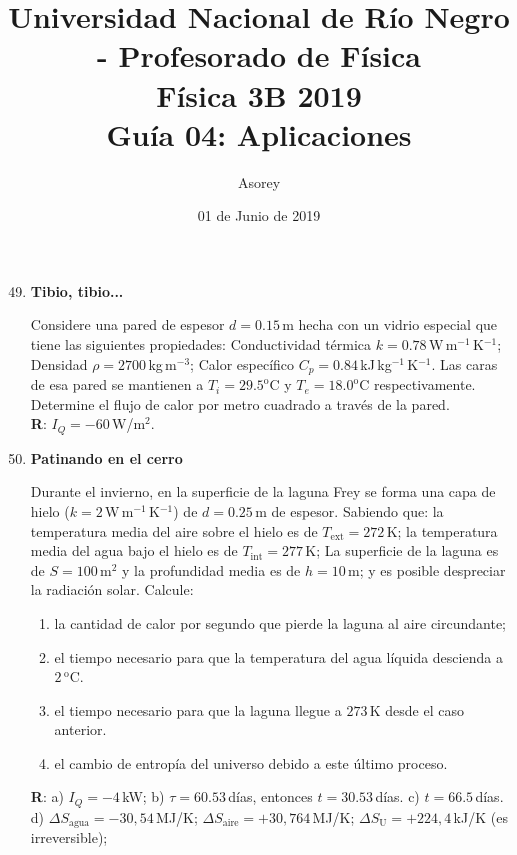 \documentclass[a4paper,12pt]{article}
\begin{document}
\title{
{\normalsize{Universidad Nacional de Río Negro - Profesorado de Física}}\\
Física 3B 2019 \\ Guía 04: Aplicaciones
}
\author{Asorey}
\date{01 de Junio de 2019}
\maketitle

\begin{enumerate}
	\setcounter{enumi}{48}     

	\item{\bf{Tibio, tibio...}}

		Considere una pared de espesor $d=0.15$\,m hecha con un vidrio especial
		que tiene las siguientes propiedades: Conductividad térmica
		$k=0.78$\,W\,m$^{-1}$\,K$^{-1}$; Densidad $\rho = 2700$\,kg\,m$^{-3}$;
		Calor específico $C_p = 0.84$\,kJ\,kg$^{-1}$\,K$^{-1}$.  Las caras de
		esa pared se mantienen a $T_i=29.5^\mathrm{o}$C y
		$T_e=18.0^\mathrm{o}$C respectivamente. Determine el flujo de calor por
		metro cuadrado a través de la pared.
		\\{\bf{R}}: $I_Q=-60$\,W/m$^2$.
	
	\item{\bf{Patinando en el cerro}}
		
		Durante el invierno, en la superficie de la laguna Frey se forma una
		capa de hielo ($k=2$\,W\,m$^{-1}$\,K$^{-1}$) de $d=0.25$\,m de espesor.
		Sabiendo que: la temperatura media del aire sobre el hielo es de
		$T_\mathrm{ext}=272$\,K; la temperatura media del agua bajo el hielo es
		de $T_\mathrm{int}=277$\,K; La superficie de la laguna es de
		$S=100$\,m$^2$ y la profundidad media es de $h=10$\,m; y es posible
		despreciar la radiación solar. Calcule:
		\begin{enumerate}
			\item la cantidad de calor por segundo que pierde la laguna al
				aire circundante;
			\item el tiempo necesario para que la temperatura del agua líquida
				descienda a $2$\,$^\mathrm{o}$C.
			\item el tiempo necesario para que la laguna llegue a $273$\,K
				desde el caso anterior.
			\item el cambio de entropía del universo debido a este último proceso.
		\end{enumerate}
		{\bf{R}}: a) $I_Q=-4$\,kW; b) $\tau=60.53$\,días, entonces
		$t=30.53$\,días. c) $t=66.5$\,días. d) $\Delta
		S_{\mathrm{agua}}=-30,54$\,MJ/K; $\Delta
		S_{\mathrm{aire}}=+30,764$\,MJ/K; $\Delta S_{\mathrm{U}}=+224,4$\,kJ/K
		(es irreversible);
	

\end{enumerate}
\end{document}
